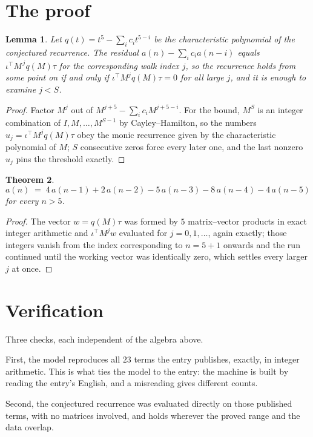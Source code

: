 \documentclass[11pt,a4paper]{article}
\theoremstyle{plain}
\newtheorem{theorem}{Theorem}
\newtheorem{lemma}[theorem]{Lemma}
\theoremstyle{definition}
\begin{document}
\section{The proof}

\begin{lemma}\label{lem:crit}
Let $q(t)=t^{5}-\sum_i c_it^{5-i}$ be the characteristic polynomial of the
conjectured recurrence. The residual $a(n)-\sum_ic_ia(n-i)$ equals
$\iota^{\!\top}M^{\,j}q(M)\tau$ for the corresponding walk index $j$, so the recurrence
holds from some point on if and only if $\iota^{\!\top}M^{j}q(M)\tau=0$ for all large $j$,
and it is enough to examine $j<S$.
\end{lemma}

\begin{proof}
Factor $M^{j}$ out of $M^{j+5}-\sum_ic_iM^{j+5-i}$. For the bound, $M^{S}$
is an integer combination of $I,M,\dots,M^{S-1}$ by Cayley--Hamilton, so the numbers
$u_j=\iota^{\!\top}M^{j}q(M)\tau$ obey the monic recurrence given by the characteristic
polynomial of $M$; $S$ consecutive zeros force every later one, and the last nonzero $u_j$
pins the threshold exactly.
\end{proof}

\begin{theorem}
\[
a(n)\;=\;4\,a(n-1) + 2\,a(n-2) - 5\,a(n-3) - 8\,a(n-4) - 4\,a(n-5)
\]
for every $n>5$.
\end{theorem}

\begin{proof}
The vector $w=q(M)\tau$ was formed by $5$ matrix--vector products in exact integer
arithmetic and $\iota^{\!\top}M^{j}w$ evaluated for $j=0,1,\dots$, again exactly; those
integers vanish from the index corresponding to $n=5+1$ onwards and the run continued
until the working vector was identically zero, which settles every larger $j$ at once.
\end{proof}

\section{Verification}

Three checks, each independent of the algebra above.

First, the model reproduces all $23$ terms the entry publishes, exactly, in integer
arithmetic. This is what ties the model to the entry: the machine is built by reading the
entry's English, and a misreading gives different counts.

Second, the conjectured recurrence was evaluated directly on those published terms, with no
matrices involved, and holds wherever the proved range and the data overlap.
\end{document}
